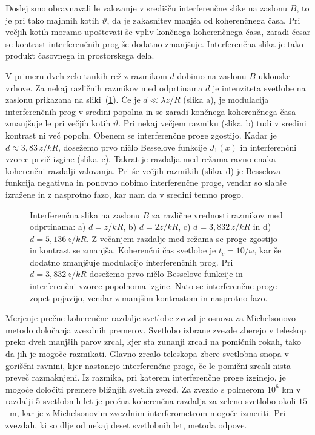 Doslej smo obravnavali le valovanje v središču interferenčne slike na
zaslonu $B$, to je pri tako majhnih kotih $\vartheta$, da je zakasnitev
manjša od koherenčnega časa. Pri večjih kotih moramo upoštevati še
vpliv končnega koherenčnega časa, zaradi česar se kontrast interferenčnih
prog še dodatno zmanjšuje. Interferenčna slika je 
tako produkt časovnega in prostorskega dela. 

V primeru dveh zelo tankih rež z razmikom $d$ dobimo na zaslonu
$B$ uklonske vrhove. Za nekaj različnih razmikov med odprtinama $d$ je intenziteta
svetlobe na zaslonu prikazana na sliki~(\ref{fig:Interferencna-slika}).
Če je $d\ll\lambda z/R$ (slika a), je modulacija interferenčnih prog v sredini
popolna in se zaradi končnega koherenčnega časa zmanjšuje le pri večjih
kotih $\vartheta$. Pri nekaj večjem razmiku (slika~b) tudi v sredini kontrast
ni več popoln. Obenem se interferenčne proge zgostijo. Kadar je $d\approx 3,83\,z/kR$,
dosežemo prvo ničlo Besselove funkcije $J_{1}(x)$ in interferenčni vzorec
prvič izgine (slika~c). Takrat je razdalja med režama ravno enaka 
koherenčni razdalji valovanja. Pri še večjih razmikih (slika~d) 
je Besselova funkcija negativna in ponovno dobimo interferenčne proge, 
vendar so slabše izražene in z nasprotno fazo, kar nam da v sredini temno progo. 

\begin{figure}[h]
\def\svgwidth{0.24\textwidth} 

\def\svgwidth{0.24\textwidth} 

\def\svgwidth{0.24\textwidth} 

\def\svgwidth{0.24\textwidth} 

\caption{Interferenčna slika na zaslonu
$B$ za različne vrednosti razmikov med odprtinama: a) $d = z/kR$, b) $d=2z/kR$, 
c) $d = 3,832\,z/kR$ in d) $d = 5,136\,z/kR$. 
Z večanjem razdalje med režama se proge zgostijo in kontrast se zmanjša. Koherenčni
čas svetlobe je $t_{c}=10/\omega$, kar še dodatno zmanjšuje modulacijo
interferenčnih prog. Pri $d=3,832\,z/kR$ dosežemo prvo ničlo Besselove
funkcije in interferenčni vzorec popolnoma izgine. Nato se interferenčne
proge zopet pojavijo, vendar z manjšim kontrastom in nasprotno fazo.}
\label{fig:Interferencna-slika}
\end{figure}

\begin{remark}
Merjenje prečne koherenčne razdalje svetlobe
zvezd je osnova za Michelsonovo metodo določanja zvezdnih premerov.
Svetlobo izbrane zvezde zberejo v teleskop preko dveh manjših parov
zrcal, kjer sta zunanji zrcali na pomičnih rokah, tako da jih je mogoče
razmikati. Glavno zrcalo teleskopa zbere svetlobna snopa v goriščni
ravnini, kjer nastanejo interferenčne proge, če le pomični zrcali
nista preveč razmaknjeni. Iz razmika, pri katerem interferenčne proge
izginejo, je mogoče določiti premere bližnjih svetlih zvezd. Za zvezdo
s polmerom $10^{6}$ km v razdalji 5 svetlobnih let je prečna koherenčna
razdalja za zeleno svetlobo okoli $15$~m, kar je z Michelsonovim
zvezdnim interferometrom mogoče izmeriti. Pri zvezdah, ki so dlje
od nekaj deset svetlobnih let, metoda odpove.
\end{remark}


